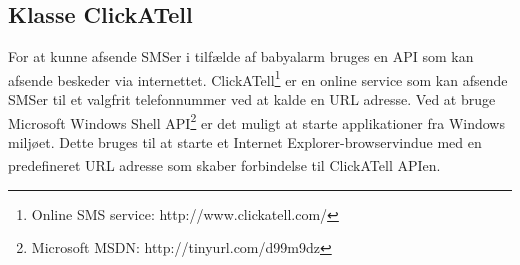\subsection{Klasse ClickATell}
For at kunne afsende SMSer i tilfælde af babyalarm bruges en API som kan afsende beskeder via internettet.
ClickATell\textsuperscript{\circledR}\footnote{Online SMS service: http://www.clickatell.com/} er en online service som kan afsende SMSer til et valgfrit telefonnummer ved at kalde en URL adresse.
Ved at bruge Microsoft Windows Shell API\footnote{Microsoft MSDN: http://tinyurl.com/d99m9dz} er det muligt at starte applikationer fra Windows miljøet. Dette bruges til at starte et Internet Explorer-browservindue med en predefineret URL adresse som skaber forbindelse til ClickATell\textsuperscript{\circledR} APIen. 